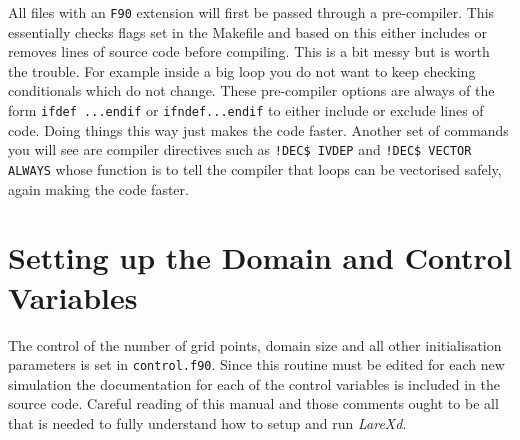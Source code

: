 \documentclass[11pt]{article}
\begin{document}
All files with an \texttt{F90} extension will first be passed through a pre-compiler. This essentially checks flags set in the Makefile and based on this either includes or removes lines of source code before compiling. This is a bit messy but is worth the trouble. For example inside a big loop you do not want to keep checking conditionals which do not change. These pre-compiler options are always of the form \texttt{ifdef ...endif} or \texttt{ifndef...endif} to either include or exclude lines of code. Doing things this way just makes the code faster. Another set of commands you will see are compiler directives such as \texttt{!DEC\$ IVDEP} and \texttt{!DEC\$ VECTOR ALWAYS} whose function is to tell the compiler that loops can be vectorised safely, again making the code faster. 

\section{Setting up the Domain and Control Variables}
The control of the number of grid points, domain size and all other initialisation parameters is set in \texttt{control.f90}. Since this routine must be edited for each new simulation the documentation for each of the control variables is included in the source code. Careful reading of this manual and those comments ought to be all that is needed to fully understand how to setup and run \textit{LareXd}.
\end{document}
